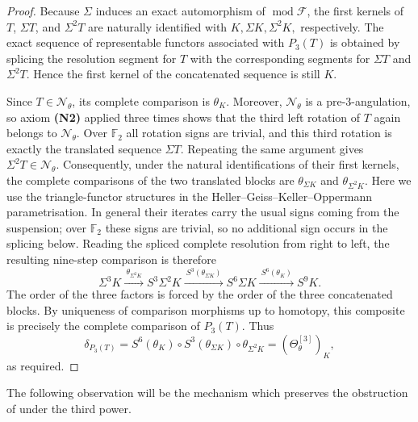 \documentclass[12pt, twoside]{article}
\numberwithin{equation}{section}
\begin{document}
\begin{proof}
Because $\Sigma$ induces an exact automorphism of $\operatorname{mod}\mathcal F$, the first kernels of $T$, $\Sigma T$, and $\Sigma^2T$ are naturally identified with
$
K, \Sigma K,\Sigma^2K,
$
respectively. The exact sequence of representable functors associated with $P_3(T)$ is obtained by splicing the resolution segment for $T$ with the corresponding segments for $\Sigma T$ and $\Sigma^2T$. Hence the first kernel of the concatenated sequence is still $K$.

Since $T\in\mathcal N_\theta$, its complete comparison is $\theta_K$. Moreover, $\mathcal N_\theta$ is a pre-$3$-angulation, so axiom \textbf{(N2)} applied three times shows that the third left rotation of $T$ again belongs to $\mathcal N_\theta$. Over $\mathbb F_2$ all rotation signs are trivial, and this third rotation is exactly the translated sequence $\Sigma T$. Repeating the same argument gives $\Sigma^2T\in\mathcal N_\theta$. Consequently, under the natural identifications of their first kernels, the complete comparisons of the two translated blocks are $\theta_{\Sigma K}$ and $\theta_{\Sigma^2K}$. Here we use the triangle-functor structures in the Heller--Geiss--Keller--Oppermann parametrisation. In general their iterates carry the usual signs coming from the suspension; over $\mathbb F_2$ these signs are trivial, so no additional sign occurs in the splicing below. Reading the spliced complete resolution from right to left, the resulting nine-step comparison is therefore
\[
\Sigma^3K
\xrightarrow{\ \theta_{\Sigma^2K}\ }
S^3\Sigma^2K
\xrightarrow{\ S^3(\theta_{\Sigma K})\ }
S^6\Sigma K
\xrightarrow{\ S^6(\theta_K)\ }
S^9K.
\]
The order of the three factors is forced by the order of the three concatenated blocks. By uniqueness of comparison morphisms up to homotopy, this composite is precisely the complete comparison of $P_3(T)$. Thus
\[
\delta_{P_3(T)}
=S^6(\theta_K)\circ S^3(\theta_{\Sigma K})\circ\theta_{\Sigma^2K}
=(\Theta_\theta^{[3]})_K,
\]
as required.
\end{proof}

The following observation will be the mechanism which preserves the obstruction of \cite{CLLZ} under the third power.
\end{document}
